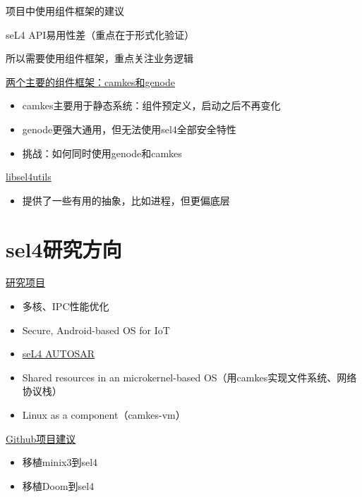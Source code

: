 \documentclass[presentation,dvipdfmx,CJKbookmarks]{beamer}
\begin{document}
\begin{CJK*}{UTF8}{simsun}
\begin{frame}[label={sec:org2302d25}]{项目中使用组件框架的建议}
\begin{block}{seL4 API\thinspace 易用性差（重点在于形式化验证）}
\end{block}
\begin{block}{所以需要使用组件框架，重点关注业务逻辑}
\end{block}
\begin{block}{\href{https://sel4.systems/About/seL4-whitepaper.pdf}{两个主要的组件框架：camkes\thinspace 和\thinspace genode}}
\begin{itemize}
\item camkes\thinspace 主要用于静态系统：组件预定义，启动之后不再变化
\item genode\thinspace 更强大通用，但无法使用\thinspace sel4\thinspace 全部安全特性
\item 挑战：如何同时使用\thinspace genode\thinspace 和\thinspace camkes
\end{itemize}
\end{block}
\begin{block}{\href{https://docs.sel4.systems/projects/sel4/frequently-asked-questions.html}{libsel4utils}}
\begin{itemize}
\item 提供了一些有用的抽象，比如进程，但更偏底层
\end{itemize}
\end{block}
\end{frame}

\section{sel4\thinspace 研究方向}
\label{sec:orgbe62c75}
\begin{frame}[label={sec:org41d1d19}]{\href{https://ts.data61.csiro.au/students/theses.pml.html}{研究项目}}
\begin{itemize}
\item 多核、IPC\thinspace 性能优化
\item Secure, Android-based OS for IoT
\item \href{https://ts.data61.csiro.au/projects/TS/realtime.pml.html}{seL4 AUTOSAR}
\item Shared resources in an microkernel-based OS（用\thinspace camkes\thinspace 实现文件系统、网络协议栈）
\item Linux as a component（camkes-vm）
\end{itemize}
\end{frame}
\begin{frame}[label={sec:org61e8bec}]{\href{https://github.com/seL4/docs/blob/master/SuggestedProjects.md}{Github\thinspace 项目建议}}
\begin{itemize}
\item 移植\thinspace minix3\thinspace 到\thinspace sel4
\item 移植\thinspace Doom\thinspace 到\thinspace sel4
\end{itemize}
\end{frame}


\end{CJK*}
\end{document}
